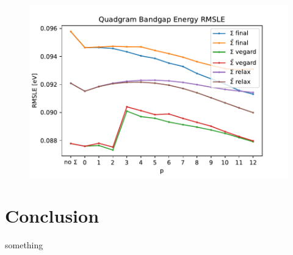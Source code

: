\documentclass[11pt,oneside,czech,american]{book} %
\theoremstyle{definition} %
\theoremstyle{definition}
\begin{document}
\begin{figure}[H]
	\centering
	\includegraphics[scale=0.6]{quadgram_RMSLE_gap.pdf}
	\caption{}
	\label{}
\end{figure}

\chapter*{Conclusion}
\pagestyle{plain}


something

\appendix
\end{document}
